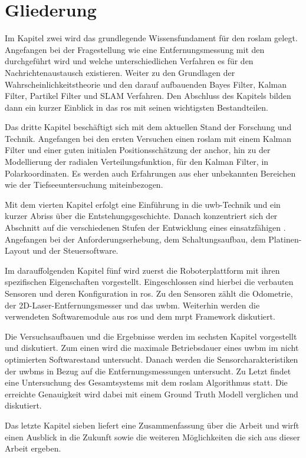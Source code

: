 \section{Gliederung}

Im Kapitel zwei wird das grundlegende Wissensfundament für den \Gls{roslam} gelegt. Angefangen bei der Fragestellung wie eine Entfernungsmessung mit den  durchgeführt wird und welche unterschiedlichen Verfahren es für den Nachrichtenaustausch existieren. Weiter zu den Grundlagen der Wahrscheinlichkeitstheorie und den darauf aufbauenden Bayes Filter, Kalman Filter, Partikel Filter und SLAM Verfahren. Den Abschluss des Kapitels bilden dann ein kurzer Einblick in das \Gls{ros} mit seinen wichtigsten Bestandteilen.

Das dritte Kapitel beschäftigt sich mit dem aktuellen Stand der Forschung und Technik. Angefangen bei den ersten Versuchen einen \Gls{roslam} mit einem Kalman Filter und einer guten initialen Positionsschätzung der \Gls{anchor}, hin zu der Modellierung der radialen Verteilungsfunktion, für den Kalman Filter, in Polarkoordinaten. Es werden auch Erfahrungen aus eher unbekannten Bereichen wie der Tiefseeuntersuchung miteinbezogen.

Mit dem vierten Kapitel erfolgt eine Einführung in die \Gls{uwb}-Technik und ein kurzer Abriss über die Entstehungsgeschichte. Danach konzentriert sich der Abschnitt auf die verschiedenen Stufen der Entwicklung eines einsatzfähigen . Angefangen bei der Anforderungserhebung, dem Schaltungsaufbau, dem Platinen-Layout und der Steuersoftware.

Im darauffolgenden Kapitel fünf wird zuerst die Roboterplattform mit ihren spezifischen Eigenschaften vorgestellt. Eingeschlossen sind hierbei die verbauten Sensoren und deren \mbox{Konfiguration} in \Gls{ros}. Zu den Sensoren zählt die Odometrie, der 2D-Laser-Entfernungsmesser und das \Gls{uwbm}. Weiterhin werden die verwendeten Softwaremodule aus \Gls{ros} und dem \Gls{mrpt} Framework diskutiert.

Die Versuchsaufbauen und die Ergebnisse werden im sechsten Kapitel vorgestellt und diskutiert. Zum einen wird die maximale Betriebsdauer eines \Gls{uwbm} im nicht optimierten Softwarestand untersucht. Danach werden die Sensorcharakteristiken der \Glspl{uwbm} in Bezug auf die Entfernungsmessungen untersucht. Zu Letzt findet eine Untersuchung des Gesamtsystems mit dem \Gls{roslam} Algorithmus statt. Die erreichte Genauigkeit wird dabei mit einem Ground Truth Modell verglichen und diskutiert.

Das letzte Kapitel sieben liefert eine Zusammenfassung über die Arbeit und wirft einen Ausblick in die Zukunft sowie die weiteren Möglichkeiten die sich aus dieser Arbeit ergeben.

